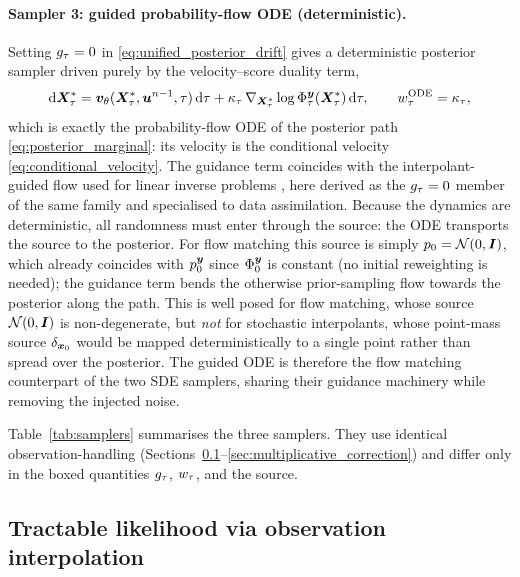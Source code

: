 \paragraph{Sampler 3: guided probability-flow ODE (deterministic).}
Setting $g_\tau=0$ in \eqref{eq:unified_posterior_drift} gives a deterministic posterior sampler driven purely by the velocity--score duality term,
\begin{align}\label{eq:posterior_ode_fm}
    \mathrm{d}\boldsymbol{X}^{*}_\tau
    = \bm{v}_\theta(\boldsymbol{X}^{*}_\tau,\boldsymbol{u}^{n-1},\tau)\,\mathrm{d}\tau
    + \kappa_\tau\,\nabla_{\boldsymbol{X}^{*}_\tau}\log\Phi_\tau^{\boldsymbol{y}}(\boldsymbol{X}^{*}_\tau)\,\mathrm{d}\tau,
    \qquad w_\tau^{\mathrm{ODE}} = \kappa_\tau,
\end{align}
which is exactly the probability-flow ODE of the posterior path \eqref{eq:posterior_marginal}: its velocity is the conditional velocity \eqref{eq:conditional_velocity}. The guidance term coincides with the interpolant-guided flow used for linear inverse problems \cite{yan_fig_2024, pokle_training-free_2024}, here derived as the $g_\tau=0$ member of the same family and specialised to data assimilation. Because the dynamics are deterministic, all randomness must enter through the source: the ODE transports the source to the posterior. For flow matching this source is simply $p_0=\mathcal{N}(0,\bm{I})$, which already coincides with $p_0^{\boldsymbol{y}}$ since $\Phi_0^{\boldsymbol{y}}$ is constant (no initial reweighting is needed); the guidance term bends the otherwise prior-sampling flow towards the posterior along the path. This is well posed for flow matching, whose source $\mathcal{N}(0,\bm{I})$ is non-degenerate, but \emph{not} for stochastic interpolants, whose point-mass source $\delta_{\boldsymbol{x}_0}$ would be mapped deterministically to a single point rather than spread over the posterior. The guided ODE is therefore the flow matching counterpart of the two SDE samplers, sharing their guidance machinery while removing the injected noise.

Table~\ref{tab:samplers} summarises the three samplers. They use identical observation-handling (Sections~\ref{subsec:obs_interpolation}--\ref{sec:multiplicative_correction}) and differ only in the boxed quantities $g_\tau$, $w_\tau$, and the source.

\subsection{Tractable likelihood via observation interpolation}
\label{subsec:obs_interpolation}

